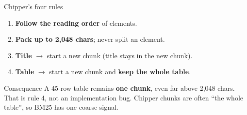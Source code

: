 \documentclass[aspectratio=169,11pt]{beamer}
\begin{document}
\begin{frame}{Chipper's four rules}
  \begin{enumerate}\small
    \item \textbf{Follow the reading order} of elements.
    \item \textbf{Pack up to 2,048 chars}; never split an element.
    \item \textbf{Title} $\rightarrow$ start a new chunk (title stays in the new chunk).
    \item \textbf{Table} $\rightarrow$ start a new chunk and \textbf{keep the whole table}.
  \end{enumerate}

  \begin{center}
  \end{center}

  \begin{alertblock}{Consequence}
    \footnotesize
    A 45-row table remains \textbf{one chunk}, even far above 2,048 chars.
    That is rule 4, not an implementation bug. Chipper chunks are often
    ``the whole table'', so BM25 has one coarse signal.
  \end{alertblock}
\end{frame}
\end{document}
